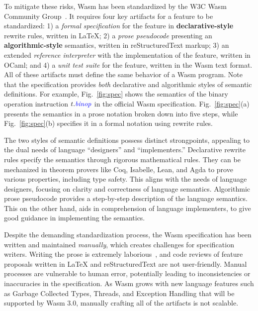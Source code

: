 To mitigate these risks, Wasm has been standardized by
the W3C Wasm Community Group~\cite{wasm-w3c}.
It requires four key artifacts for a feature to be standardized:
1) a \textit{formal specification} for the feature in \textbf{declarative-style} rewrite rules, written in LaTeX;
2) a \textit{prose pseudocode} presenting an \textbf{algorithmic-style} semantics, written in reStructuredText markup;
3) an extended \textit{reference interpreter} with the implementation of the feature, written in OCaml; and
4) a \textit{unit test suite} for the feature, written in the Wasm text format.
All of these artifacts must define the same behavior of a Wasm program.
Note that the specification provides \textit{both} declarative and algorithmic styles of semantic definitions.
For example, Fig.~\ref{fig:spec} shows the semantics of the binary operation instruction
$t.\mathit{{\color{blue}{binop}}}$ in the official Wasm specification.
Fig.~\ref{fig:spec}(a) presents the semantics in a prose notation broken down into five steps,
while Fig.~\ref{fig:spec}(b) specifies it in a formal notation using rewrite rules.

The two styles of semantic definitions possess distinct strongpoints,
appealing to the dual needs of language ``designers'' and ``implementers.''
Declarative rewrite rules specify the semantics through rigorous mathematical rules.
They can be mechanized in theorem provers like Coq, Isabelle, Lean, and Agda
to prove various properties, including type safety.
This aligns with the needs of language designers,
focusing on clarity and correctness of language semantics.
Algorithmic prose pseudocode provides a step-by-step description of the language semantics.
This on the other hand, aids in comprehension of language implementers,
to give good guidance in implementing the semantics.

Despite the demanding standardization process, the Wasm specification has been
written and maintained \textit{manually}, which creates challenges for specification writers.
Writing the prose is extremely laborious~\cite{Andreasicfp23}, and code reviews of
feature proposals written in LaTeX and reStructuredText are not user-friendly.
Manual processes are vulnerable to human error, potentially leading
to inconsistencies or inaccuracies in the specification.
As Wasm grows with new language features such as Garbage Collected Types, Threads,
and Exception Handling that will be supported by Wasm 3.0,
manually crafting all of the artifacts is not scalable.

